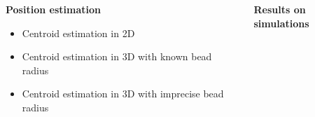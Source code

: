 \documentclass[final,svgnames,dvipsnames,table]{beamer}
\begin{document}
\begin{frame}[fragile]
\begin{columns}[t,totalwidth=\textwidth]
\begin{column}{0.32\textwidth}
%          
%          
%
%          


    
      \begin{minipage}{1\textwidth}\centering
        \begin{block}{\bf Position estimation}
        \begin{itemize}
        \item Centroid estimation in 2D 
        \item Centroid estimation in 3D with known bead radius
        \item Centroid estimation in 3D with imprecise bead radius
      \end{itemize}
        \end{block}
        \end{minipage}

        
            \end{column}
    \begin{column}{0.32\textwidth}
        \begin{block}{\bf \color{white} Results on simulations}
          \null\centering\relax


\end{block}
\end{column}
\end{columns}
\end{frame}
\end{document}
